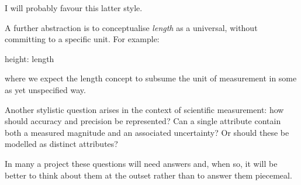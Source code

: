I will probably favour this latter style.

A further abstraction is to conceptualise \textit{length} as a universal, without committing to a specific unit. For example:

\begin{erquote}
height: length
\end{erquote}
where we expect the length concept to subsume the unit of measurement in some as yet unspecified way. 

Another stylistic question arises in the context of scientific measurement: how should accuracy and precision be represented? Can a single attribute contain both a measured magnitude and an associated uncertainty? Or should these be modelled as distinct attributes?

In many a project these questions will need answers and, when so, it will be better to think about them at the outset rather than to answer them piecemeal.















